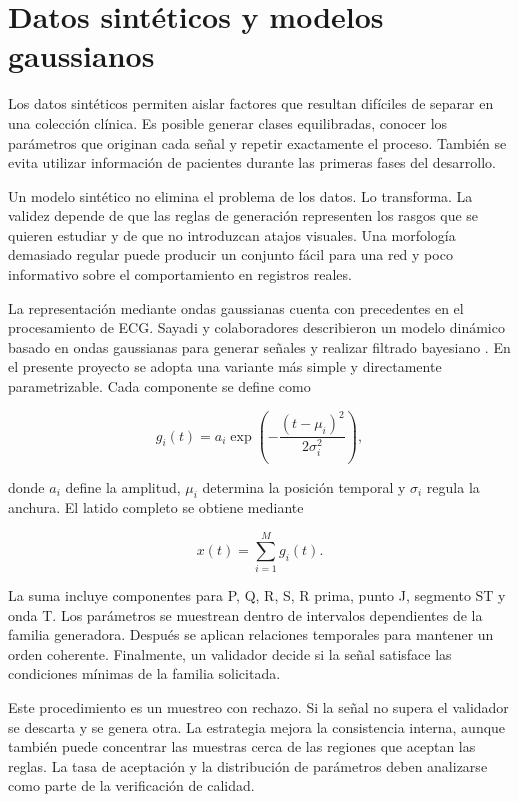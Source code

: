 \section{Datos sintéticos y modelos gaussianos}

Los datos sintéticos permiten aislar factores que resultan difíciles de separar en una colección clínica. Es posible generar clases equilibradas, conocer los parámetros que originan cada señal y repetir exactamente el proceso. También se evita utilizar información de pacientes durante las primeras fases del desarrollo.

Un modelo sintético no elimina el problema de los datos. Lo transforma. La validez depende de que las reglas de generación representen los rasgos que se quieren estudiar y de que no introduzcan atajos visuales. Una morfología demasiado regular puede producir un conjunto fácil para una red y poco informativo sobre el comportamiento en registros reales.

La representación mediante ondas gaussianas cuenta con precedentes en el procesamiento de ECG. Sayadi y colaboradores describieron un modelo dinámico basado en ondas gaussianas para generar señales y realizar filtrado bayesiano \cite{sayadi2010}. En el presente proyecto se adopta una variante más simple y directamente parametrizable. Cada componente se define como

\begin{equation}
g_i(t) =
a_i
\exp\left(
  -\frac{(t-\mu_i)^2}{2\sigma_i^2}
\right),
\label{eq:gaussian_atom}
\end{equation}

donde \(a_i\) define la amplitud, \(\mu_i\) determina la posición temporal y \(\sigma_i\) regula la anchura. El latido completo se obtiene mediante

\begin{equation}
x(t) = \sum_{i=1}^{M} g_i(t).
\label{eq:gaussian_sum}
\end{equation}

La suma incluye componentes para P, Q, R, S, R prima, punto J, segmento ST y onda T. Los parámetros se muestrean dentro de intervalos dependientes de la familia generadora. Después se aplican relaciones temporales para mantener un orden coherente. Finalmente, un validador decide si la señal satisface las condiciones mínimas de la familia solicitada.

Este procedimiento es un muestreo con rechazo. Si la señal no supera el validador se descarta y se genera otra. La estrategia mejora la consistencia interna, aunque también puede concentrar las muestras cerca de las regiones que aceptan las reglas. La tasa de aceptación y la distribución de parámetros deben analizarse como parte de la verificación de calidad.

